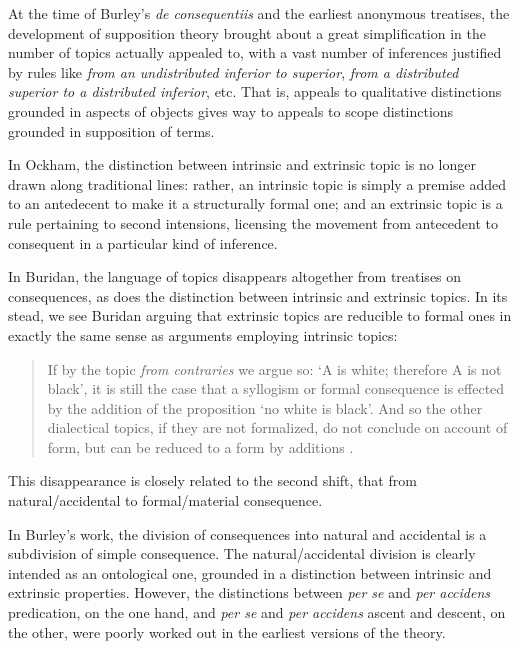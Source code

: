 \documentclass[]{article}
\begin{document}
		At the time of Burley's \textit{de consequentiis} and the earliest anonymous treatises, the development of supposition theory brought about a great simplification in the number of topics actually appealed to, with a vast number of inferences justified by rules like \textit{from an undistributed inferior to superior}, \textit{from a distributed superior to a distributed inferior}, etc. That is, appeals to qualitative distinctions grounded in aspects of objects gives way to appeals to scope distinctions grounded in supposition of terms.
		
		In Ockham, the distinction between intrinsic and extrinsic topic is no longer drawn along traditional lines: rather, an intrinsic topic is simply a premise added to an antedecent to make it a structurally formal one; and an extrinsic topic is a rule pertaining to second intensions, licensing the movement from antecedent to consequent in a particular kind of inference. 
		
		In Buridan, the language of topics disappears altogether from treatises on consequences, as does the distinction between intrinsic and extrinsic topics. In its stead, we see Buridan arguing that extrinsic topics are reducible to formal ones in exactly the same sense as arguments employing intrinsic topics: 
		\begin{quote}
			If by the topic \textit{from contraries} we argue so: `A is white; therefore A is not black', it is still the case that a syllogism or formal consequence is effected by the addition of the proposition `no white is black'. And so the other dialectical topics, if they are not formalized, do not conclude on account of form, but can be reduced to a form by additions \cite[sec. 6.6]{BuridanLoci}.
		\end{quote}
		
		This disappearance is closely related to the second shift, that from natural/accidental to formal/material consequence. 
		
		In Burley's work, the division of consequences into natural and accidental is a subdivision of simple consequence. The natural/accidental division is clearly intended as an ontological one, grounded in a distinction between intrinsic and extrinsic properties. However, the distinctions between \textit{per se} and \textit{per accidens} predication, on the one hand, and \textit{per se} and \textit{per accidens} ascent and descent, on the other, were poorly worked out in the earliest versions of the theory. 
		
\end{document}
